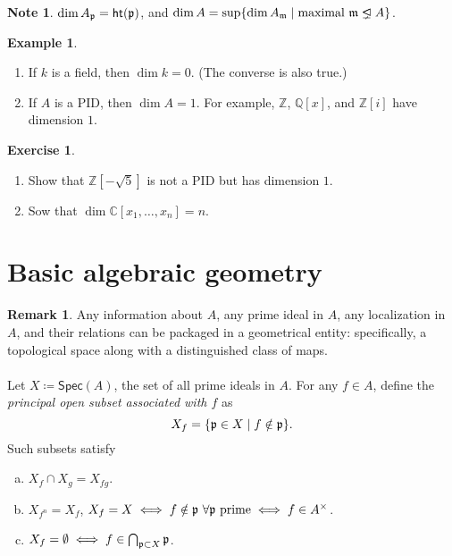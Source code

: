 \documentclass[10pt,letterpaper,cm]{nupset}
\theoremstyle{definition}
\newtheorem{exmp}{Example}
\newtheorem{note}{Note}
\newtheorem{remark}{Remark}
\newtheorem{exercise}{Exercise}
\newcommand{\C}{\mathbb C}
\newcommand{\Q}{\mathbb Q}
\newcommand{\Z}{\mathbb Z}
\newcommand{\1}{\mathbf{1}}
\newcommand{\p}{\frak{p}}
\newcommand{\0}{\vec 0}
\newcommand{\properideal}{%
  \mathrel{\ooalign{$\lneq$\cr\raise.22ex\hbox{$\lhd$}\cr}}}
\begin{document}
\begin{note}
$\dim{A_{\p}} = \mathsf{ht}(\p)$, and $\dim{A} = \sup \{ \dim{A_{\frak{m}}} \mid \text{maximal } \frak{m} \properideal A \}$.
\end{note}

\begin{exmp} $ $
\begin{enumerate}
\item If $k$ is a field, then $\dim{k} =0$. (The converse is also true.)
\item If $A$ is a PID, then $\dim{A} =1$. For example, $\Z$, $\Q[x]$, and $\Z[i]$ have dimension $1$.
\end{enumerate}
\end{exmp}

\begin{exercise} $ $
\begin{enumerate}
\item Show that $\Z[-\sqrt{5}]$ is not a PID but has dimension $1$. 
\item Sow that $\dim{\C[x_1, \ldots, x_n]} =n$. 
\end{enumerate}
\end{exercise}

\section{Basic algebraic geometry}

\begin{remark}
Any information about $A$, any prime ideal in $A$, any localization in $A$, and their relations can be packaged in a geometrical entity: specifically, a topological space along with a distinguished class of maps. 
\\ \\ Let $X\coloneqq  \mathsf{Spec}(A)$, the set of all prime ideals in $A$.  For any $f\in A$, define the \textit{principal open subset associated with $f$} as $$X_f = \{ \p \in X \mid f\notin \p\}.$$  Such subsets satisfy 
\begin{enumerate}[(a)]
\item $X_f \cap X_g = X_{fg}$.
\item $X_{f^n} = X_f$, $X_f = X \iff f\notin \p \ \forall \p \text{ prime} \iff f\in A^{\times}$.
\item $X_f = \emptyset \iff f \in \bigcap_{\p \subset X} \p$.
\end{enumerate}
\end{remark}
\end{document}
